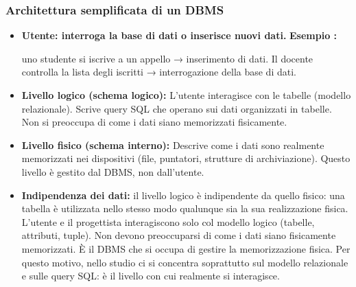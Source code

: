 \documentclass{article}
\newcounter{esempio}
\newenvironment{esempio}{
	\refstepcounter{esempio}%
	\noindent\textbf{Esempio \theesempio:}
}{\par}
\begin{document}
\subsubsection{Architettura semplificata di un DBMS}
\begin{itemize}
    \item \textbf{Utente: interroga la base di dati o inserisce nuovi dati.}
    \begin{esempio}
    	uno studente si iscrive a un appello → inserimento di dati. Il docente controlla la lista degli iscritti → interrogazione della base di dati.
    \end{esempio}

\item \textbf{Livello logico (schema logico):}
L'utente interagisce con le tabelle (modello relazionale). Scrive query SQL che operano sui dati organizzati in tabelle. Non si preoccupa di come i dati siano memorizzati fisicamente.

\item\textbf{Livello fisico (schema interno):} Descrive come i dati sono realmente memorizzati nei dispositivi (file, puntatori, strutture di archiviazione). Questo livello è gestito dal DBMS, non dall'utente.

\item \textbf{Indipendenza dei dati:} il livello logico è indipendente da quello fisico: una tabella è utilizzata nello stesso modo qualunque sia la sua realizzazione fisica. L'utente e il progettista interagiscono solo col modello logico (tabelle, attributi, tuple). Non devono preoccuparsi di come i dati siano fisicamente memorizzati. È il DBMS che si occupa di gestire la memorizzazione fisica. Per questo motivo, nello studio ci si concentra soprattutto sul modello relazionale e sulle query SQL: è il livello con cui realmente si interagisce.
\end{itemize}
\end{document}
